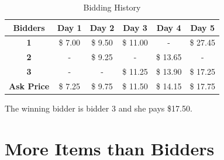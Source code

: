 \documentclass[]{article}
\begin{document}
\begin{table}[htbp]
	\centering
	\caption{Bidding History}
	\begin{tabular}{c|ccccc}
		\rowcolor[rgb]{ 0,  0,  0} \textcolor[rgb]{ 1,  1,  1}{\textbf{Bidders}} & \textcolor[rgb]{ 1,  1,  1}{\textbf{Day 1}} & \textcolor[rgb]{ 1,  1,  1}{\textbf{Day 2}} & \textcolor[rgb]{ 1,  1,  1}{\textbf{Day 3}} & \textcolor[rgb]{ 1,  1,  1}{\textbf{Day 4}} & \textcolor[rgb]{ 1,  1,  1}{\textbf{Day 5}} \\
		\midrule
		\rowcolor[rgb]{ .184,  .459,  .71} \textcolor[rgb]{ 1,  1,  1}{\textbf{1}} & \textcolor[rgb]{ 1,  1,  1}{ \$        7.00 } & \textcolor[rgb]{ 1,  1,  1}{ \$        9.50 } & \textcolor[rgb]{ 1,  1,  1}{ \$     11.00 } & \textcolor[rgb]{ 1,  1,  1}{ - } & \textcolor[rgb]{ 1,  1,  1}{ \$     27.45 } \\
		\rowcolor[rgb]{ .184,  .459,  .71} \textcolor[rgb]{ 1,  1,  1}{\textbf{2}} & \cellcolor[rgb]{ .357,  .608,  .835} \textcolor[rgb]{ 1,  1,  1}{ - } & \textcolor[rgb]{ 1,  1,  1}{ \$        9.25 } & \cellcolor[rgb]{ .357,  .608,  .835} \textcolor[rgb]{ 1,  1,  1}{ - } & \textcolor[rgb]{ 1,  1,  1}{ \$     13.65 } & \cellcolor[rgb]{ .357,  .608,  .835} \textcolor[rgb]{ 1,  1,  1}{ - } \\
		\rowcolor[rgb]{ .184,  .459,  .71} \textcolor[rgb]{ 1,  1,  1}{\textbf{3}} & \textcolor[rgb]{ 1,  1,  1}{ - } & \textcolor[rgb]{ 1,  1,  1}{ - } & \textcolor[rgb]{ 1,  1,  1}{ \$     11.25 } & \textcolor[rgb]{ 1,  1,  1}{ \$     13.90 } & \textcolor[rgb]{ 1,  1,  1}{ \$     17.25 } \\
		\rowcolor[rgb]{ .184,  .459,  .71} \textcolor[rgb]{ 1,  1,  1}{\textbf{Ask Price}} & \cellcolor[rgb]{ .357,  .608,  .835} \textcolor[rgb]{ 1,  1,  1}{ \$        7.25 } & \textcolor[rgb]{ 1,  1,  1}{ \$        9.75 } & \cellcolor[rgb]{ .357,  .608,  .835} \textcolor[rgb]{ 1,  1,  1}{ \$     11.50 } & \textcolor[rgb]{ 1,  1,  1}{ \$     14.15 } & \cellcolor[rgb]{ .357,  .608,  .835} \textcolor[rgb]{ 1,  1,  1}{ \$     17.75 } \\
	\end{tabular}
	\label{Q2.1 Bidding History}
\end{table}

The winning bidder is bidder 3 and she pays \$17.50.

\newpage
\section{More Items than Bidders}
\end{document}
